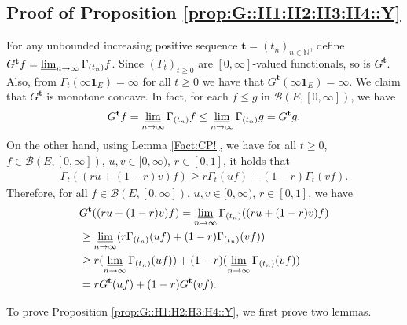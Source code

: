 \documentclass[12pt,a4paper]{amsart}
\numberwithin{equation}{section}
\theoremstyle{plain}
\theoremstyle{definition}
\theoremstyle{remark}
\begin{document}
\subsection{Proof of Proposition \ref{prop:G::H1:H2:H3:H4::Y}}\label{sec:G}
	For any unbounded increasing positive sequence $\mathbf t = (t_n)_{n\in \mathbb N}$, define $G^\mathbf t f = \varliminf_{n\to \infty} \Gamma_{(t_n)} f$.
	Since $(\Gamma_t)_{t\geq 0}$ are $[0,\infty]$-valued functionals, so is $G^{\mathbf t}$.
	Also, from $\Gamma_t(\infty  \mathbf 1_E) = \infty$ for all $t\geq 0$ we have that $G^{\mathbf t}(\infty  \mathbf 1_E) = \infty$.
	We claim that $G^\mathbf t$ is monotone concave.
	In fact, for each $f \leq g$ in $\mathcal B(E,[0,\infty])$, we have
	\begin{equation}
	G^{\mathbf t} f
	= \varliminf_{n\to \infty} \Gamma_{(t_n)} f
	\leq \varliminf_{n\to \infty} \Gamma_{(t_n)} g
	= G^{\mathbf t} g.
	\end{equation}
	On the other hand, using Lemma \ref{Fact:CP!}, we have for all $t\geq 0$, $f\in \mathcal B(E,[0,\infty])$, $u,v \in [0,\infty)$, $r\in [0,1]$, it holds that
	\begin{align}
	\Gamma_t((ru+(1-r) v)f)
	\geq r \Gamma_t (uf) + (1-r) \Gamma_t (vf).
	\end{align}
	Therefore, for all $f\in \mathcal B(E,[0,\infty])$, $u,v \in [0,\infty)$, $r \in [0,1]$, we have
	\begin{align}
	& G^{\mathbf t}((ru + (1-r)v)f)
	= \varliminf_{n \to \infty} \Gamma_{(t_n)}((ru + (1-r)v)f)
	\\&\geq \varliminf_{n\to \infty} (r\Gamma_{(t_n)} (uf) + (1-r)\Gamma_{(t_n)}(vf))
	\\&\geq r (\varliminf_{n\to \infty} \Gamma_{(t_n)} (uf)) + (1-r) (\varliminf_{n\to \infty} \Gamma_{(t_n)}(vf) )
	\\&= r G^{\mathbf t} (uf) + (1-r) G^{\mathbf t}(vf).
	\end{align}

	To prove Proposition \ref{prop:G::H1:H2:H3:H4::Y}, we first prove two lemmas.
\end{document}
